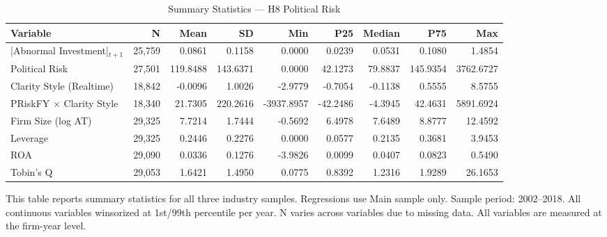 \begin{table}[htbp]
\centering
\caption{Summary Statistics — H8 Political Risk}
\label{tab:summary_stats_h8}
\begin{tabular}{lrrrrrrrr}
\toprule
Variable & N & Mean & SD & Min & P25 & Median & P75 & Max \\
\midrule
|Abnormal Investment|$_{t+1}$ & 25,759 & 0.0861 & 0.1158 & 0.0000 & 0.0239 & 0.0531 & 0.1080 & 1.4854 \\
Political Risk & 27,501 & 119.8488 & 143.6371 & 0.0000 & 42.1273 & 79.8837 & 145.9354 & 3762.6727 \\
Clarity Style (Realtime) & 18,842 & -0.0096 & 1.0026 & -2.9779 & -0.7054 & -0.1138 & 0.5555 & 8.5755 \\
PRiskFY $\times$ Clarity Style & 18,340 & 21.7305 & 220.2616 & -3937.8957 & -42.2486 & -4.3945 & 42.4631 & 5891.6924 \\
Firm Size (log AT) & 29,325 & 7.7214 & 1.7444 & -0.5692 & 6.4978 & 7.6489 & 8.8777 & 12.4592 \\
Leverage & 29,325 & 0.2446 & 0.2276 & 0.0000 & 0.0577 & 0.2135 & 0.3681 & 3.9453 \\
ROA & 29,090 & 0.0336 & 0.1276 & -3.9826 & 0.0099 & 0.0407 & 0.0823 & 0.5490 \\
Tobin's Q & 29,053 & 1.6421 & 1.4950 & 0.0775 & 0.8392 & 1.2316 & 1.9289 & 26.1653 \\
\bottomrule
\end{tabular}
\begin{tablenotes}
\small
\item This table reports summary statistics for all three industry samples. Regressions use Main sample only. Sample period: 2002--2018. All continuous variables winsorized at 1st/99th percentile per year. N varies across variables due to missing data.
All variables are measured at the firm-year level.
\end{tablenotes}
\end{table}